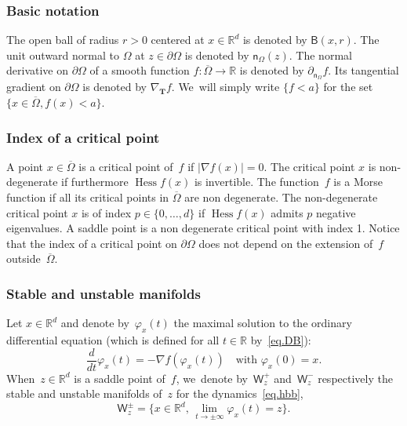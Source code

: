 \documentclass[JEP,XML,SOM,Unicode,NoEqCountersInSection,NoFloatCountersInSection,published]{cedram}
\newcommand{\mbf}[1]{\mathbf{#1}}
\DeclareMathOperator{\hess}{Hess}\let\Hess\hess
\theoremstyle{plain}
\theoremstyle{definition}
\begin{document}
\subsubsection*{Basic notation} The open ball of radius $r>0$ centered at $x\in \mathbb R^d$ is denoted by $\mathsf B(x,r)$. The unit outward normal to $\Omega$ at $z\in \partial \Omega$ is denoted by $\mathsf n_\Omega(z)$. The normal derivative on $\partial \Omega$ of a smooth function $f:\overline \Omega\to \mathbb R$ is denoted by $\partial_{\mathsf n_\Omega}f$. Its tangential gradient on $\partial \Omega$ is denoted by $\nabla_{\mbf T}f$. We~will simply write $\{f<a\}$ for the set \hbox{$\{x\in \overline \Omega, f(x)<a\}$}.

\subsubsection*{Index of a critical point} A point $x \in \overline{\Omega}$ is a critical
point of~$f$ if $|\nabla f(x)|=0$. The critical point $x$ is non-degenerate
if furthermore $\hess f(x)$ is invertible. The function~$f$ is a Morse function if all its critical points in $\overline \Omega$ are non degenerate. The non-degenerate critical
point $x$ is of index $p\in \{0,\ldots,d\}$ if $\hess f(x)$ admits $p$
negative eigenvalues. A saddle point is a non
degenerate critical point with index 1. Notice that the
index of a critical point on $\partial \Omega$ does not depend on the
extension of~$f$ outside~$\overline{\Omega}$.

\subsubsection*{Stable and unstable manifolds}
Let $x\in \mathbb R^d$ and denote by~$\varphi_x(t)$ the maximal
solution to the ordinary differential equation (which is defined
for all $t \in \mathbb R$ by~\eqref{eq.DB}):
\begin{equation}\label{eq.hbb}
\frac{d}{dt}\varphi_x(t)=-\nabla f(\varphi_x(t)) \quad\text{with } \varphi_x(0)=x.
\end{equation}
When~$z\in\mathbb R^d$ is a saddle point of~$f$, we~denote by~$\mathsf W_z^+$ and~$\mathsf W_z^-$ respectively the stable and unstable manifolds of~$z$ for the dynamics~\eqref{eq.hbb}, \ie
\begin{equation}\label{eq.stablem}
\mathsf W_z^{\pm}=\Big \{x\in \mathbb R^d,\, \lim_{t\to \pm \infty}\varphi_x(t)= z \Big \}.
\end{equation}
\end{document}
